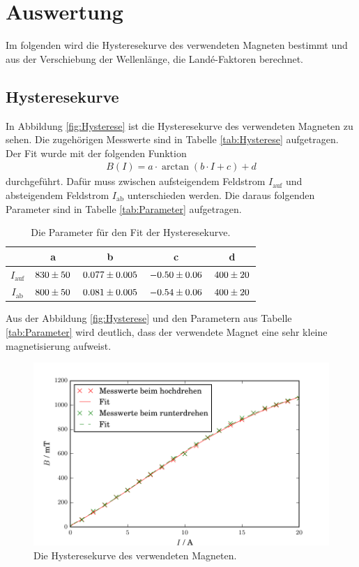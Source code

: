 \newpage
\section{Auswertung}
\label{sec:Auswertung}
Im folgenden wird die Hysteresekurve des verwendeten Magneten bestimmt und aus der Verschiebung der Wellenlänge, die Landé-Faktoren berechnet.

\subsection{Hysteresekurve}
In Abbildung \eqref{fig:Hysterese} ist die Hysteresekurve des verwendeten Magneten zu sehen. Die zugehörigen Messwerte sind in Tabelle \eqref{tab:Hysterese} aufgetragen. Der Fit wurde mit der folgenden Funktion
\begin{align*}
  B(I) = a\cdot \arctan(b\cdot I + c) + d
\end{align*}
durchgeführt. Dafür muss zwischen aufsteigendem Feldstrom $I_\text{auf}$ und absteigendem Feldstrom $I_\text{ab}$ unterschieden werden. Die daraus folgenden Parameter sind in Tabelle \eqref{tab:Parameter} aufgetragen.

\begin{table}[H] %
  \centering
  \caption{Die Parameter für den Fit der Hysteresekurve.}
  \label{tab:Parameter}
  \begin{tabular}{c|c|c|c|c}
    & a & b & c & d \\
    \hline
    $I_\text{auf}$ & $\num{830 +- 50}$ & $\num{0.077 +- 0.005}$ & $\num{-0.50 +- 0.06}$ & $\num{400 +- 20}$ \\
    $I_\text{ab}$ & $\num{800 +- 50}$ & $\num{0.081 +- 0.005}$ & $\num{-0.54 +- 0.06}$ & $\num{400 +- 20}$ \\
  \end{tabular}
\end{table}

Aus der Abbildung \eqref{fig:Hysterese} und den Parametern aus Tabelle \eqref{tab:Parameter} wird deutlich, dass der verwendete Magnet eine sehr kleine magnetisierung aufweist.

\begin{figure}[H] %
  \centering
  \includegraphics[width=1.3\linewidth, angle=90]{Bilder/Hysterese.pdf}
  \caption{Die Hysteresekurve des verwendeten Magneten.}
  \label{fig:Hysterese}
\end{figure}

